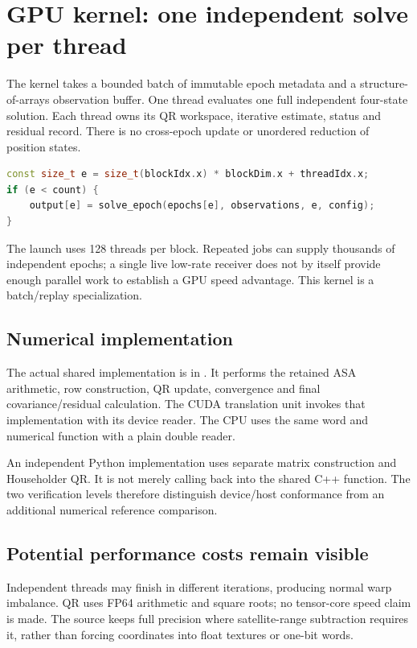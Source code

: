 \section{GPU kernel: one independent solve per thread}
The kernel takes a bounded batch of immutable epoch metadata and a structure-of-arrays
observation buffer. One thread evaluates one full independent four-state solution.
Each thread owns its QR workspace, iterative estimate, status and residual record.
There is no cross-epoch update or unordered reduction of position states.

\begin{lstlisting}[language=C++]
const size_t e = size_t(blockIdx.x) * blockDim.x + threadIdx.x;
if (e < count) {
    output[e] = solve_epoch(epochs[e], observations, e, config);
}
\end{lstlisting}
The launch uses 128 threads per block. Repeated jobs can supply thousands of independent
epochs; a single live low-rate receiver does not by itself provide enough parallel work
to establish a GPU speed advantage. This kernel is a batch/replay specialization.

\subsection{Numerical implementation}
The actual shared implementation is in . It performs
the retained ASA arithmetic, row construction, QR update, convergence and final
covariance/residual calculation. The CUDA translation unit invokes that implementation
with its device reader. The CPU uses the same word and numerical function with a
plain double reader.

An independent Python implementation uses separate matrix construction and Householder
QR. It is not merely calling back into the shared C++ function. The two verification
levels therefore distinguish device/host conformance from an additional numerical
reference comparison.

\subsection{Potential performance costs remain visible}
Independent threads may finish in different iterations, producing normal warp
imbalance. QR uses FP64 arithmetic and square roots; no tensor-core speed claim is
made. The source keeps full precision where satellite-range subtraction requires it,
rather than forcing coordinates into float textures or one-bit words.

